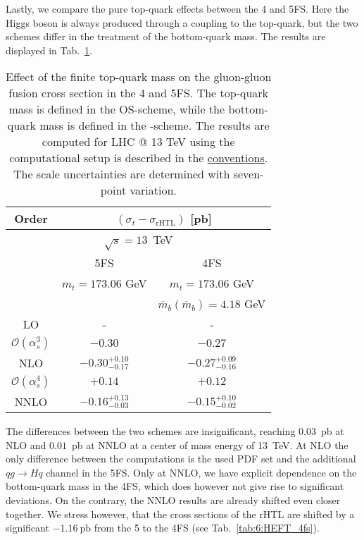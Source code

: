 Lastly, we compare the pure top-quark effects between the 4 and 5\acs{FS}. Here the Higgs boson is always produced through a coupling to the top-quark, but the two schemes differ in the treatment of the bottom-quark mass. The results are displayed in Tab.~\ref{tab:6:t-rHTL_4vs5FS}.
\begin{table}[t]
\centering
\begin{tabular}{ccc}
  \hline
  Order & \multicolumn{2}{c}{$(\sigma_{t} - \sigma_\text{rHTL})$ [pb]} \\
  \hline
  \hline
  \multicolumn{3}{c}{$\sqrt{s}=13$~TeV} \\
  \hline
  & 5FS & 4FS \\
  & $m_t = 173.06$ GeV &  $m_t = 173.06$ GeV \\
  & & $\overline{m}_b(\overline{m}_b)=4.18$ GeV\\
  \hline
  LO & - & - \\
  \hline
  $\mathcal{O}(\alpha_s^3)$ & $-0.30$  &  $-0.27$ \\
  NLO & $-0.30^{+0.10}_{-0.17}$ & $-0.27^{+0.09}_{-0.16}$ \\
  \hline
  $\mathcal{O}(\alpha_s^4)$ & $+0.14$ & $+0.12$ \\
  NNLO & $-0.16^{+0.13}_{-0.03}$ & $-0.15^{+0.10}_{-0.02}$\\
  \hline
  \end{tabular}
\caption{Effect of the finite top-quark mass on the gluon-gluon fusion cross section in the 4 and 5\acs{FS}. The top-quark mass is defined in the \acs{OS}-scheme, while the bottom-quark mass is defined in the \MS-scheme. The results are computed for LHC @ 13 TeV using the computational setup is described in the \hyperref[chap:notation_and_conventions]{conventions}. The scale uncertainties are determined with seven-point variation.}
\label{tab:6:t-rHTL_4vs5FS}
\end{table}
The differences between the two schemes are insignificant, reaching $0.03$~pb at \acs{NLO} and $0.01$~pb at \acs{NNLO} at a center of mass energy of 13~TeV. At \acs{NLO} the only difference between the computations is the used \acs{PDF} set and the additional $qg \longrightarrow Hq$ channel in the 5\acs{FS}. Only at \acs{NNLO}, we have explicit dependence on the bottom-quark mass in the 4\acs{FS}, which does however not give rise to significant deviations. On the contrary, the \acs{NNLO} results are already shifted even closer together. We stress however, that the cross sections of the \acs{rHTL} are shifted by a significant $-1.16\ \mathrm{pb}$ from the 5 to the 4\acs{FS} (see Tab.~\ref{tab:6:HEFT_4fs}).

